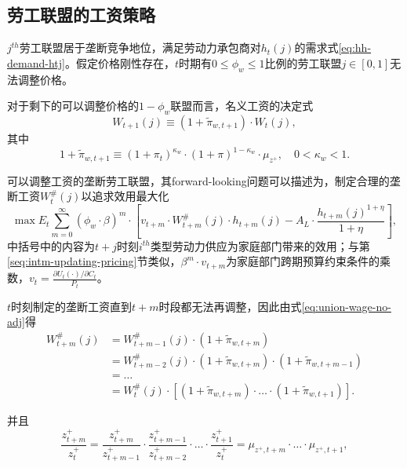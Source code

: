 \subsection{劳工联盟的工资策略}
\label{sec:wage-setting-monopoly-union}
$j^{th}$劳工联盟居于垄断竞争地位，满足劳动力承包商对$h_t(j)$的需求式\eqref{eq:hh-demand-htj}。假定价格刚性存在，$t$时期有$0 \le \phi_{w} \le 1$比例的劳工联盟$j \in [0,1]$无法调整价格。

对于剩下的可以调整价格的$1-\phi_{w}$联盟而言，名义工资的决定式
\begin{equation}
  \label{eq:union-wage-no-adj}
  W_{t+1}(j) \equiv \left(1+\tilde{\pi}_{w,t+1}\right) \cdot W_t(j),
\end{equation}
其中
\begin{equation}
  \label{eq:union-wage-no-adj-inflation}
  1+\tilde{\pi}_{w,t+1} \equiv (1+\pi_t)^{\kappa_w} \cdot (1+\pi)^{1-\kappa_w} \cdot \mu_{z^+}, \quad 0<\kappa_w<1.
\end{equation}

可以调整工资的垄断劳工联盟，其forward-looking问题可以描述为，制定合理的垄断工资$W_t^{\#}(j)$以追求效用最大化
\begin{equation}
  \label{eq:union-wage-adj-max-prob}
  \max E_t \sum_{m=0}^{\infty} \left(\phi_w \cdot \beta \right)^{m}  \cdot \left[v_{t+m} \cdot W_{t+m}^{\#}(j) \cdot h_{t+m}(j) - A_L \cdot \frac{h_{t+m}(j)^{1+\eta}}{1+\eta}\right],
\end{equation}
中括号中的内容为$t+j$时刻$i^{th}$类型劳动力供应为家庭部门带来的效用；与第\ref{seq:intm-updating-pricing}节类似，$\beta^m \cdot v_{t+m}$为家庭部门跨期预算约束条件的乘数，$v_{t}=\frac{\partial U_t(\cdot) / \partial C_t}{P_t}$。

$t$时刻制定的垄断工资直到$t+m$时段都无法再调整，因此由式\eqref{eq:union-wage-no-adj}得
\begin{align}
  \label{eq:W-sharp-iteration}
  W_{t+m}^{\#}(j) &= W_{t+m-1}^{\#}(j) \cdot (1+\tilde{\pi}_{w,t+m}) \nonumber \\
                  &= W_{t+m-2}^{\#}(j) \cdot (1+\tilde{\pi}_{w,t+m}) \cdot (1+\tilde{\pi}_{w,t+m-1}) \nonumber \\
                  &= \ldots  \nonumber \\
                  &= W_t^{\#}(j) \cdot \left[(1+\tilde{\pi}_{w,t+m}) \cdot \ldots \cdot (1+\tilde{\pi}_{w,t+1})\right].
\end{align}

并且
\begin{equation}
  \label{eq:zplus-t-tplusm}
  \frac{z_{t+m}^+}{z_t^+} = \frac{z_{t+m}^+}{z_{t+m-1}^+} \cdot \frac{z_{t+m-1}^+}{z_{t+m-2}^+} \cdot \ldots \cdot \frac{z_{t+1}^+}{z_{t}^+} = \mu_{z^+,t+m} \cdot \ldots \cdot \mu_{z^+,t+1},
\end{equation}

